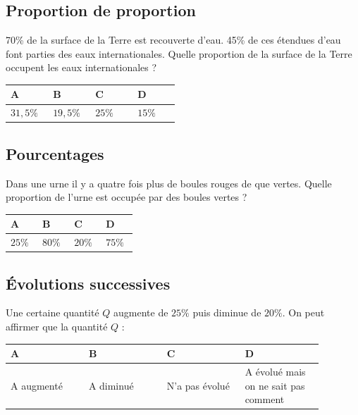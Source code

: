 \documentclass[oneside,12pt]{article}
\begin{document}
\subsection{Proportion de proportion}
70\% de la surface de la Terre est recouverte d’eau. 45\% de ces étendues d’eau font parties des eaux
internationales. Quelle proportion de la surface de la Terre occupent les eaux internationales ?

\begin{center}
	\renewcommand{\arraystretch}{1.35}
	\begin{tabular}{| P{0.22\linewidth} | P{0.22\linewidth} | P{0.22\linewidth} | P{0.22\linewidth} |} \hline
	A & B & C & D \\ \hline
	$31,5\%$ & $19,5\%$ & $25\%$ & $15\%$ \\\hline
	\end{tabular}
\end{center}



\subsection{Pourcentages}
Dans une urne il y a quatre fois plus de boules rouges de que vertes. Quelle proportion de l’urne est
occupée par des boules vertes ?

\begin{center}
	\renewcommand{\arraystretch}{1.35}
	\begin{tabular}{| P{0.22\linewidth} | P{0.22\linewidth} | P{0.22\linewidth} | P{0.22\linewidth} |} \hline
	A & B & C & D \\ \hline
	$25\%$ & $80\%$ & $20\%$ & $75\%$ \\\hline
	\end{tabular}
\end{center}



\subsection{Évolutions successives}
Une certaine quantité $Q$ augmente de $25\%$ puis diminue de $20\%$. On peut affirmer que la quantité $Q$ :

\begin{center}
	\renewcommand{\arraystretch}{1.35}
	\begin{tabular}{| P{0.22\linewidth} | P{0.22\linewidth} | P{0.22\linewidth} | P{0.22\linewidth} |} \hline
	A & B & C & D \\ \hline
	\vspace*{-5pt} A augmenté & \vspace*{-5pt} A diminué & \vspace*{-5pt} N'a pas évolué & A évolué mais on ne sait pas comment \\\hline
	\end{tabular}
\end{center}
\end{document}
